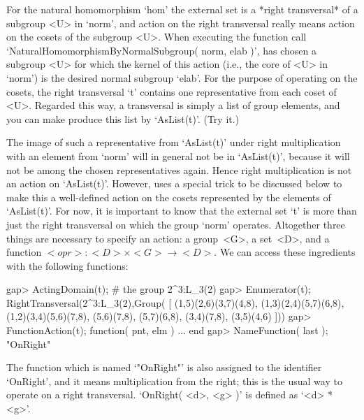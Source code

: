 For  the   natural homomorphism   `hom' the  external   set  is a  *right
transversal* of a subgroup  <U>   in `norm',  and   action on the   right
transversal really means action  on the cosets  of the subgroup <U>. When
executing  the function  call `NaturalHomomorphismByNormalSubgroup( norm,
elab )', {\GAP} has  chosen a subgroup  <U> for which  the kernel of this
action (i.e., the core of  <U> in `norm')  is the desired normal subgroup
`elab'. For the purpose of operating on the cosets, the right transversal
`t' contains  one representative  from each coset  of <U>.  Regarded this
way, a transversal  is simply a list of  group elements, and you can make
{\GAP} produce this list by `AsList(t)'. (Try it.)

The  image of  such   a   representative from  `AsList(t)' under    right
multiplication with an  element  from `norm'  will in general  not be  in
`AsList(t)',  because it will   not  be among the  chosen representatives
again.   Hence right multiplication is not   an action on `AsList(t)'.
However, {\GAP} uses a special trick to be discussed below to make this a
well-defined  action  on the  cosets   represented by the  elements of
`AsList(t)'. For now, it is important  to know that  the external set `t'
is   more  than just the  right  transversal  on  which  the group `norm'
operates. Altogether three things  are necessary to specify an action:
a  group~<G>, a  set~<D>, and a   function $<opr>\colon <D>\times  <G>\to
<D>$. We can access these ingredients with the following functions:

\beginexample
gap> ActingDomain(t);  # the group
2^3:L_3(2)
gap> Enumerator(t);
RightTransversal(2^3:L_3(2),Group(
[ (1,5)(2,6)(3,7)(4,8), (1,3)(2,4)(5,7)(6,8), (1,2)(3,4)(5,6)(7,8), 
  (5,6)(7,8), (5,7)(6,8), (3,4)(7,8), (3,5)(4,6) ]))
gap> FunctionAction(t);
function( pnt, elm ) ... end
gap> NameFunction( last );
"OnRight"
\endexample

The function  which   is  named  `"OnRight"'  is  also   assigned to  the
identifier `OnRight', and it means multiplication from the right; this is
the usual way to operate on a right transversal. `OnRight( <d>, <g> )' is
defined as `<d> * <g>'.

%

